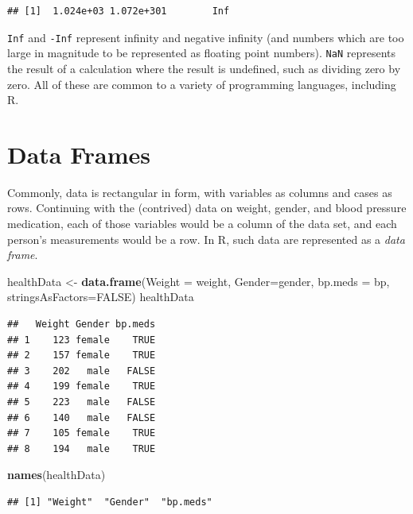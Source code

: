 \documentclass[
]{krantz}
\newenvironment{Shaded}{\begin{snugshade}}{\end{snugshade}}
\newcommand{\DataTypeTok}[1]{\textcolor[rgb]{0.13,0.29,0.53}{#1}}
\newcommand{\KeywordTok}[1]{\textcolor[rgb]{0.13,0.29,0.53}{\textbf{#1}}}
\newcommand{\NormalTok}[1]{#1}
\newcommand{\OtherTok}[1]{\textcolor[rgb]{0.56,0.35,0.01}{#1}}
\newcommand{\StringTok}[1]{\textcolor[rgb]{0.31,0.60,0.02}{#1}}
\begin{document}
\begin{verbatim}
## [1]  1.024e+03 1.072e+301        Inf
\end{verbatim}

\texttt{Inf} and \texttt{-Inf} represent infinity and negative infinity (and numbers which are too large in magnitude to be represented as floating point numbers). \texttt{NaN} represents the result of a calculation where the result is undefined, such as dividing zero by zero. All of these are common to a variety of programming languages, including R.

\hypertarget{dataFrames}{%
\section{Data Frames}\label{dataFrames}}

Commonly, data is rectangular in form, with variables as columns and cases as rows. Continuing with the (contrived) data on weight, gender, and blood pressure medication, each of those variables would be a column of the data set, and each person's measurements would be a row. In R, such data are represented as a \emph{data frame}.

\begin{Shaded}
\begin{Highlighting}[]
\NormalTok{healthData \textless{}{-}}\StringTok{ }\KeywordTok{data.frame}\NormalTok{(}\DataTypeTok{Weight =}\NormalTok{ weight, }\DataTypeTok{Gender=}\NormalTok{gender, }
             \DataTypeTok{bp.meds =}\NormalTok{ bp,}
                         \DataTypeTok{stringsAsFactors=}\OtherTok{FALSE}\NormalTok{)}
\NormalTok{healthData}
\end{Highlighting}
\end{Shaded}

\begin{verbatim}
##   Weight Gender bp.meds
## 1    123 female    TRUE
## 2    157 female    TRUE
## 3    202   male   FALSE
## 4    199 female    TRUE
## 5    223   male   FALSE
## 6    140   male   FALSE
## 7    105 female    TRUE
## 8    194   male    TRUE
\end{verbatim}

\begin{Shaded}
\begin{Highlighting}[]
\KeywordTok{names}\NormalTok{(healthData)}
\end{Highlighting}
\end{Shaded}

\begin{verbatim}
## [1] "Weight"  "Gender"  "bp.meds"
\end{verbatim}
\end{document}
